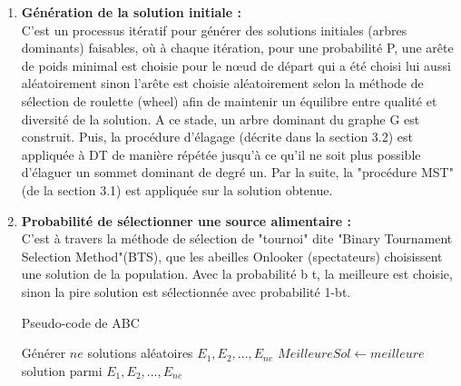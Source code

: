 \begin{enumerate}[label=\alph*)]
	
	\item \textbf{Génération de la solution initiale :}\\
	C’est un processus itératif pour générer des solutions initiales (arbres dominants) faisables, où à chaque itération, pour une probabilité P, une arête de poids minimal est choisie pour le nœud de départ qui a été choisi lui aussi aléatoirement sinon l’arête est choisie aléatoirement selon la méthode de sélection de roulette (wheel) afin de maintenir un équilibre entre qualité et diversité de la solution. A ce stade, un arbre dominant du graphe G est construit. Puis, la procédure d’élagage (décrite dans la section 3.2) est appliquée à DT de manière répétée jusqu’à ce qu’il ne soit plus possible d’élaguer un sommet dominant de degré un. Par la suite, la "procédure MST" (de la section 3.1) est appliquée sur la solution obtenue.

	\item \textbf{Probabilité de sélectionner une source alimentaire :}\\
	C’est à travers la méthode de sélection de "tournoi" dite "Binary Tournament Selection Method"(BTS), que les abeilles Onlooker (spectateurs) choisissent une solution de  la population. Avec la probabilité b t, la meilleure est choisie, sinon la pire solution est sélectionnée avec probabilité 1-bt.\\
	

\begin{algorithm}[H]
\label{alg3:ABC}
\caption{ Pseudo-code de ABC }
\SetAlgoLined
\DontPrintSemicolon
\large


Générer $ne$ solutions aléatoires $E_1 , E_2 , ..., E_{ne}$ \;
$MeilleureSol \gets meilleure $ solution parmi $E_1 , E_2 , ..., E_{ne}$ \;

\end{algorithm}
\end{enumerate}
